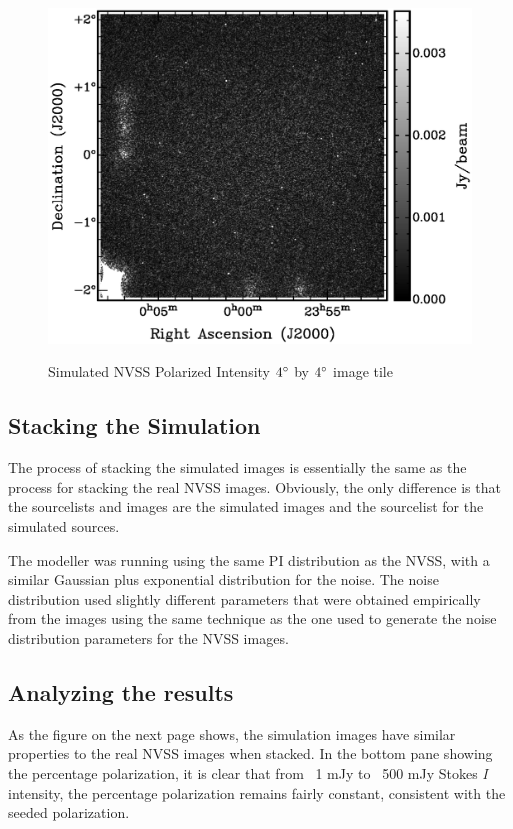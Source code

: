 \documentclass{article}
\begin{document}
\begin{figure}[H]
\begin{center}
\includegraphics[trim=0cm 1cm 0cm 1cm, clip, scale=0.65]{Simulation_PI.eps}\\
\end{center}
\caption[Simulated NVSS PI image]{Simulated NVSS Polarized Intensity 
$4\degree$ by $4\degree$ image tile}
\end{figure}

\subsection{Stacking the Simulation}
The process of stacking the simulated images is essentially the same as the 
process for stacking the real NVSS images.  Obviously, the only difference is 
that the sourcelists and images are the simulated images and the sourcelist for
the simulated sources. \par

The modeller was running using the same PI distribution as the NVSS, with 
a similar Gaussian plus exponential distribution for the noise.  The noise 
distribution used slightly different parameters that were obtained empirically 
from the images using the same technique as the one used to generate the noise
distribution parameters for the NVSS images.

\subsection{Analyzing the results}
As the figure on the next page shows, the simulation images have similar 
properties to the real NVSS images when stacked.  In the bottom pane showing
the percentage polarization, it is clear that from ~1 mJy to ~500 mJy Stokes
\emph{I} intensity, the percentage polarization remains fairly constant, 
consistent with the seeded polarization.\par
\end{document}

